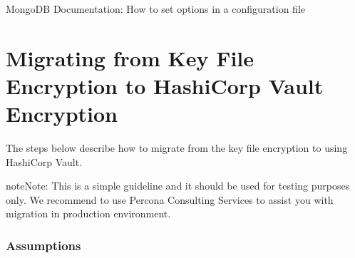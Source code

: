 \documentclass[letterpaper,10pt,english]{sphinxmanual}
\begin{document}
\begin{sphinxVerbatim}[commandchars=\\\{\}]
\end{sphinxVerbatim}


\nopagebreak

\begin{description}
\item[{MongoDB Documentation: How to set options in a configuration file}] \leavevmode
\sphinxAtStartPar
{}

\end{description}




\section{Migrating from Key File Encryption to HashiCorp Vault Encryption}
\label{\detokenize{encryption-mode-switch:migrating-from-key-file-encryption-to-vault-encryption}}\label{\detokenize{encryption-mode-switch:psmdb-encryption-mode-switch}}\label{\detokenize{encryption-mode-switch::doc}}
\sphinxAtStartPar
The steps below describe how to migrate from the key file encryption to using  HashiCorp Vault.

\begin{sphinxadmonition}{note}{Note:}
\sphinxAtStartPar
This is a simple guideline and it should be used for testing purposes only. We recommend to use Percona Consulting Services to assist you with migration in production environment.
\end{sphinxadmonition}
\subsubsection*{Assumptions}
\end{document}
